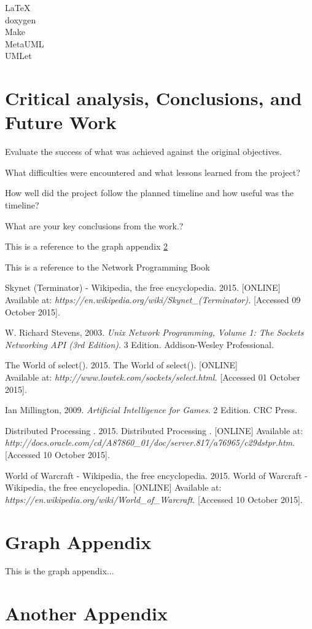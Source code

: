 \documentclass[12pt,a4paper,titlepage]{article}
\begin{document}
LaTeX\\
doxygen\\
Make\\
MetaUML\\
UMLet\\

\section{Critical analysis, Conclusions, and Future Work}

Evaluate the success of what was achieved against the original objectives. 

What difficulties were encountered and what lessons learned from the project? 

How well did the project follow the planned timeline and how useful was the timeline?  

What are your key conclusions from the work.?

This is a reference to the graph appendix \ref{appendix:graph}

This is a reference to the Network Programming Book \cite[p.~215]{stevensunp}

\newpage

\begin{thebibliography}{99}

Skynet (Terminator) - Wikipedia, the free encyclopedia. 2015. [ONLINE] Available at: \textit{https://en.wikipedia.org/wiki/Skynet\_(Terminator).} [Accessed 09 October 2015].

W. Richard Stevens, 2003. \textit{Unix Network Programming, Volume 1: The Sockets Networking API (3rd Edition)}. 3 Edition. Addison-Wesley Professional.

The World of select(). 2015. The World of select(). [ONLINE] \\
Available at: \textit{http://www.lowtek.com/sockets/select.html.} [Accessed 01 October 2015].

Ian Millington, 2009. \textit{Artificial Intelligence for Games}. 2 Edition. CRC Press.

Distributed Processing . 2015. Distributed Processing . [ONLINE] Available at: \textit{http://docs.oracle.com/cd/A87860\_01/doc/server.817/a76965/c29dstpr.htm}. [Accessed 10 October 2015].

World of Warcraft - Wikipedia, the free encyclopedia. 2015. World of Warcraft - Wikipedia, the free encyclopedia. [ONLINE] Available at: \textit{https://en.wikipedia.org/wiki/World\_of\_Warcraft}. [Accessed 10 October 2015].

\end{thebibliography}



\newpage
\begin{appendices}

\section{Graph Appendix}
\label{appendix:graph}
This is the graph appendix...

\section{Another Appendix}

\end{appendices}
\end{document}

